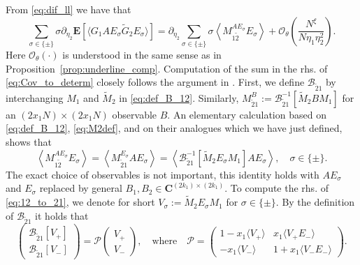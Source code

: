 \documentclass[10pt]{amsart}
\numberwithin{equation}{section}
\newcommand{\E}{\mathbf{E}}
\newcommand{\C}{\mathbf{C}}
\begin{document}
From \eqref{eq:dif_ll} we have that
\begin{equation}
\sum_{\sigma\in\{\pm\}}\sigma\partial_{\eta_2}\E\left[\langle G_1AE_\sigma \widetilde{G}_2 E_\sigma\rangle\right] = \partial_{\eta_2}\sum_{\sigma\in\{\pm\}} \sigma\left\langle M_{1\widetilde{2}}^{AE_\sigma}E_\sigma\right\rangle + \mathcal{O}_\theta\left(\frac{N^\xi}{N\eta_1\eta_2^2}\right).
\label{eq:Cov_to_determ}
\end{equation}
Here $\mathcal{O}_\theta(\cdot)$ is understood in the same sense as in Proposition~\ref{prop:underline_comp}. Computation of the sum in the rhs. of \eqref{eq:Cov_to_determ} closely follows the argument in \cite[Eq.(7.25)-(7.27)]{hyperuniformity}. First, we define $\mathcal{B}_{\widetilde{2}1}$ by interchanging $M_1$ and $\widetilde{M}_2$ in \eqref{eq:def_B_12}. Similarly, $M_{\widetilde{2}1}^B:=\mathcal{B}_{\widetilde{2}1}^{-1}[\widetilde{M}_2BM_1]$ for an $(2x_1N)\times (2x_1N)$ observable $B$. An elementary calculation based on \eqref{eq:def_B_12}, \eqref{eq:M2def}, and on their analogues which we have just defined, shows that
\begin{equation}
\left\langle M_{1\widetilde{2}}^{AE_\sigma}E_\sigma\right\rangle = \left\langle M_{\widetilde{2}1}^{E_\sigma}AE_\sigma\right\rangle = \left\langle \mathcal{B}_{\widetilde{2}1}^{-1}[\widetilde{M}_2E_\sigma M_1] AE_\sigma\right\rangle,\quad \sigma\in\{\pm\}.
\label{eq:12_to_21}
\end{equation}
The exact choice of observables is not important, this identity holds with $AE_\sigma$ and $E_\sigma$ replaced by general $B_1,B_2\in\C^{(2k_1)\times (2k_1)}$. To compute the rhs. of \eqref{eq:12_to_21}, we denote for short $V_\sigma:=\widetilde{M}_2E_\sigma M_1$ for $\sigma\in\{\pm\}$. By the definition of $\mathcal{B}_{\widetilde{2}1}$ it holds that
\begin{equation}
\begin{pmatrix}
\mathcal{B}_{\widetilde{2}1}[V_+]\\\mathcal{B}_{\widetilde{2}1}[V_-]
\end{pmatrix}
=\mathcal{P}\begin{pmatrix}
V_+\\V_-
\end{pmatrix},\quad\text{where}\quad
\mathcal{P}=
\begin{pmatrix}
1-x_1\langle V_+\rangle&x_1\langle V_+E_-\rangle\\ -x_1\langle V_-\rangle &1+x_1\langle V_-E_-\rangle
\end{pmatrix}.
\label{eq:B_V}
\end{equation}
\end{document}
